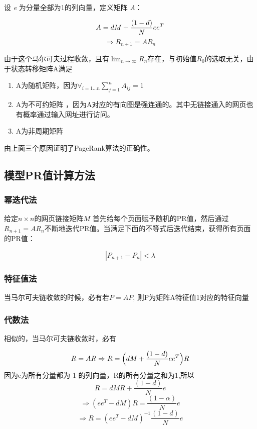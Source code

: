 \documentclass[UTF8
]{ctexart}
\begin{document}
设 \emph{e} 为分量全部为1的列向量，定义矩阵 \emph{A}：

\[A=dM+{(1-d)\over N}ee^T\]
\[\Rightarrow R_{n+1}=AR_n\]

由于这个马尔可夫过程收敛，且有\(\lim_{n \rightarrow \infty}R_{n}\)存在，与初始值\(R_0\)的选取无关，由于状态转移矩阵A满足

\begin{enumerate}
\def\labelenumi{\arabic{enumi}.}
\item
  A为随机矩阵，因为\(\forall_{i=1...n} \sum_{j=1}^{n}A_{ij}=1 \)
\item
  A为不可约矩阵
  ，因为A对应的有向图是强连通的。其中无链接通入的网页也有概率通过输入网址进行访问。
\item
  A为非周期矩阵
\end{enumerate}

由上面三个原因证明了PageRank算法的正确性。

\hypertarget{header-n83}{%
\subsection{模型PR值计算方法}\label{header-n83}}

\hypertarget{header-n84}{%
\subsubsection{幂迭代法}\label{header-n84}}
给定\(n\times n\)的网页链接矩阵\(M\)
首先给每个页面赋予随机的PR值，然后通过\(R_{n+1}=AR_{n}\)不断地迭代PR值。当满足下面的不等式后迭代结束，获得所有页面的PR值：

\[|P_{n+1}-P_n|<\lambda\]

\hypertarget{header-n87}{%
\subsubsection{特征值法}\label{header-n87}}

当马尔可夫链收敛的时候，必有若\(P=AP\),
则P为矩阵A特征值1对应的特征向量

\hypertarget{header-n90}{%
\subsubsection{代数法}\label{header-n90}}

相似的，当马尔可夫链收敛时，必有

\[ R = A R \\
\Rightarrow R = \Bigl( d M + \frac{(1 - d)}{N}ee^T \Bigr) R \]
因为e为所有分量都为 1 的列向量，R的所有分量之和为1,所以
\[ R = d MR + \frac{(1 - d)}{N}e \]
\[\Rightarrow (ee^T - d M)R = \frac{(1 - \alpha)}{N}e \]
\[\Rightarrow R = (ee^T - d M)^{-1} \frac{(1-d)}{N}e \]
\end{document}
